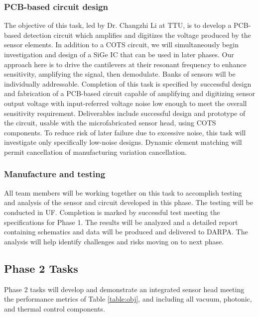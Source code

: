 \subsubsection{PCB-based circuit design}\label{sec:p1:cir}

The objective of this task, led by Dr. Changzhi Li at TTU, is to develop a PCB-based detection circuit which amplifies and digitizes the voltage produced by the sensor elements. In addition to a COTS circuit, we will simultaneously begin investigation and design of a SiGe IC that can be used in later phases. Our approach here is to drive the cantilevers at their resonant frequency to enhance sensitivity, amplifying the signal, then demodulate. Banks of sensors will be individually addressable. Completion of this task is specified by successful design and fabrication of a PCB-based circuit capable of amplifying and digitizing sensor output voltage with input-referred voltage noise low enough to meet the overall sensitivity requirement. Deliverables include successful design and prototype of the circuit, usable with the microfabricated sensor head, using COTS components. To reduce risk of later failure due to excessive noise, this task will investigate only specifically low-noise designs. Dynamic element matching will permit cancellation of manufacturing variation cancellation.


\subsubsection{Manufacture and testing}

All team members will be working together on this task to accomplish testing and analysis of the sensor and circuit developed in this phase. The testing will be conducted in UF. Completion is marked by successful test meeting the specifications for Phase 1. The results will be analyzed and a detailed report containing schematics and data will be produced and delivered to DARPA. The analysis will help identify challenges and risks moving on to next phase.

\subsection{Phase 2 Tasks}
  
Phase 2 tasks will develop and demonstrate an integrated sensor head meeting the performance metrics of Table \ref{table:obj}, and including all vacuum, photonic, and thermal control components.

